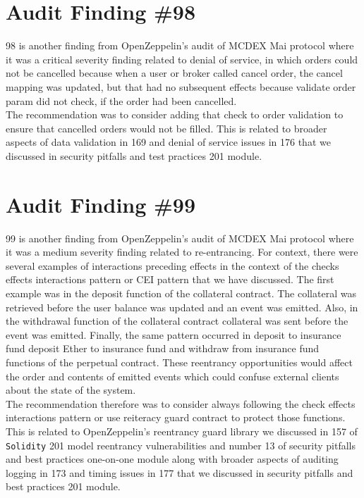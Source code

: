 \section{Audit Finding \#98}

98 is another finding from OpenZeppelin's audit of MCDEX Mai protocol where it was a critical severity finding related to denial of service, in which orders could not be cancelled because when a user or broker called cancel order, the cancel mapping was updated, but that had no subsequent effects because validate order param did not check, if the order had been cancelled.\\

The recommendation was to consider adding that check to order validation to ensure that cancelled orders would not be filled. This is related to broader aspects of data validation in 169 and denial of service issues in 176 that we discussed in security pitfalls and test practices 201 module.

\section{Audit Finding \#99}

99 is another finding from OpenZeppelin's audit of MCDEX Mai protocol where it was a medium severity finding related to re-entrancing. For context, there were several examples of interactions preceding effects in the context of the checks effects interactions pattern or CEI pattern that we have discussed. The first example was in the deposit function of the collateral contract. The collateral was retrieved before the user balance was updated and an event was emitted. Also, in the withdrawal function of the collateral contract collateral was sent before the event was emitted. Finally, the same pattern occurred in deposit to insurance fund deposit Ether to insurance fund and withdraw from insurance fund functions of the perpetual contract. These reentrancy opportunities would affect the order and contents of emitted events which could confuse external clients about the state of the system.\\

The recommendation therefore was to consider always following the check effects interactions pattern or use reiteracy guard contract to protect those functions. This is related to OpenZeppelin's reentrancy guard library we discussed in 157 of \verb|Solidity| 201 model reentrancy vulnerabilities and number 13 of security pitfalls and best practices one-on-one module along with broader aspects of auditing logging in 173 and timing issues in 177 that we discussed in security pitfalls and best practices 201 module.

